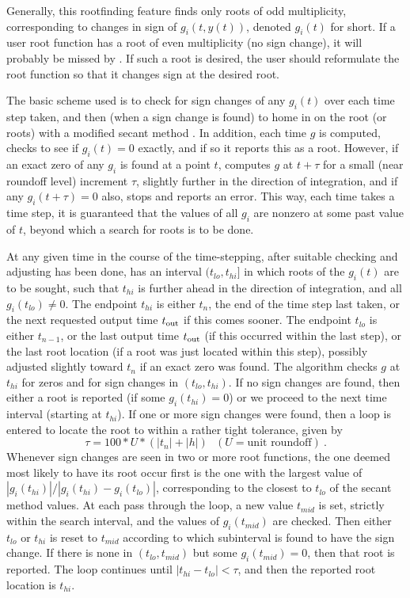 Generally, this rootfinding feature finds only roots of odd
multiplicity, corresponding to changes in sign of $g_i(t,y(t))$,
denoted $g_i(t)$ for short.  If a user root function has a root of
even multiplicity (no sign change), it will probably be missed by
{\cvode}.  If such a root is desired, the user should reformulate the
root function so that it changes sign at the desired root.

The basic scheme used is to check for sign changes of any $g_i(t)$ over
each time step taken, and then (when a sign change is found) to home
in on the root (or roots) with a modified secant method \cite{HeSh:80}.  
In addition, each time $g$ is computed, {\cvode} checks to see if 
$g_i(t) = 0$ exactly, and if so it reports this as a root.  However,
if an exact zero of any $g_i$ is found at a point $t$, {\cvode}
computes $g$ at $t + \tau$ for a small (near roundoff level) increment
$\tau$, slightly further in the direction of integration, and if any
$g_i(t + \tau) = 0$ also, {\cvode} stops and reports an error.  This
way, each time {\cvode} takes a time step, it is guaranteed that the
values of all $g_i$ are nonzero at some past value of $t$, beyond
which a search for roots is to be done.

At any given time in the course of the time-stepping, after suitable
checking and adjusting has been done, {\cvode} has an interval
$(t_{lo},t_{hi}]$ in which roots of the $g_i(t)$ are to be sought, such
that $t_{hi}$ is further ahead in the direction of integration, and
all $g_i(t_{lo}) \neq 0$.  The endpoint $t_{hi}$ is either $t_n$,
the end of the time step last taken, or the next requested output time
$t_{\mbox{\scriptsize out}}$ if this comes sooner.  The endpoint
$t_{lo}$ is either $t_{n-1}$, or the last output time
$t_{\mbox{\scriptsize out}}$ (if this occurred within the last
step), or the last root location (if a root was just located within
this step), possibly adjusted slightly toward $t_n$ if an exact zero
was found.  The algorithm checks $g$ at $t_{hi}$ for zeros and for
sign changes in $(t_{lo},t_{hi})$.  If no sign changes are found, then
either a root is reported (if some $g_i(t_{hi}) = 0$) or we proceed to
the next time interval (starting at $t_{hi}$).  If one or more sign
changes were found, then a loop is entered to locate the root to
within a rather tight tolerance, given by
\[ \tau = 100 * U * (|t_n| + |h|)~~~ (U = \mbox{unit roundoff}) ~. \]
Whenever sign changes are seen in two or more root functions, the one
deemed most likely to have its root occur first is the one with the
largest value of $|g_i(t_{hi})|/|g_i(t_{hi}) - g_i(t_{lo})|$,
corresponding to the closest to $t_{lo}$ of the secant method values.
At each pass through the loop, a new value $t_{mid}$ is set, strictly
within the search interval, and the values of $g_i(t_{mid})$ are
checked.  Then either $t_{lo}$ or $t_{hi}$ is reset to $t_{mid}$
according to which subinterval is found to have the sign change.  If
there is none in $(t_{lo},t_{mid})$ but some $g_i(t_{mid}) = 0$, then
that root is reported.  The loop continues until 
$|t_{hi}-t_{lo}| < \tau$, and then the reported root location is
$t_{hi}$.

